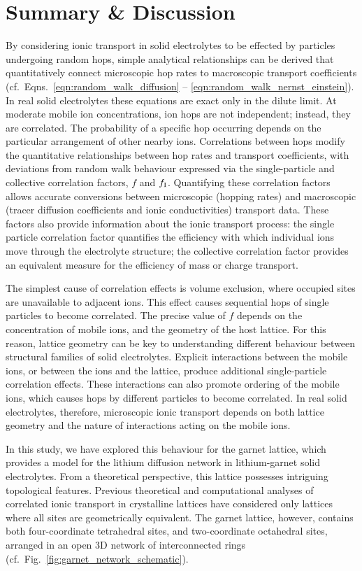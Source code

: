 \documentclass[aps,prb,twocolumn,superscriptaddress,reprint]{revtex4-1}
\begin{document}
\section{Summary \& Discussion}

By considering ionic transport in solid electrolytes to be effected by particles undergoing random hops, simple analytical relationships can be derived that quantitatively connect microscopic hop rates to macroscopic transport coefficients (cf.\ Eqns.~\ref{eqn:random_walk_diffusion} -- \ref{eqn:random_walk_nernst_einstein}). In real solid electrolytes these equations are exact only in the dilute limit. At moderate mobile ion concentrations, ion hops are not independent; 
instead, they are correlated. The probability of a specific hop occurring depends on the particular arrangement of other nearby ions. Correlations between hops modify the quantitative relationships between hop rates and transport coefficients, with deviations from random walk behaviour expressed via the single-particle and collective correlation factors, $f$ and $f_{\mathrm{I}}$. Quantifying these correlation factors allows accurate conversions between microscopic (hopping rates) and macroscopic (tracer diffusion coefficients and ionic conductivities) transport data. These factors also provide information about the ionic transport process: the single particle correlation factor quantifies the efficiency with which individual ions move through the electrolyte structure; the collective correlation factor provides an equivalent measure for the efficiency of mass or charge transport.

The simplest cause of correlation effects is volume exclusion, where occupied sites are unavailable to adjacent ions. This effect causes sequential hops of single particles to become correlated. The precise value of $f$ depends on the concentration of mobile ions, and the geometry of the host lattice. For this reason, lattice geometry can be key to understanding different behaviour between structural families of solid electrolytes. Explicit interactions between the mobile ions, or between the ions and the lattice, produce additional single-particle correlation effects. These interactions can also promote ordering of the mobile ions, which causes hops by different particles to become correlated. In real solid electrolytes, therefore, microscopic ionic transport depends on both lattice geometry and the nature of interactions acting on the mobile ions.

In this study, we have explored this behaviour for the garnet lattice, which provides a model for the lithium diffusion network in lithium-garnet solid electrolytes. From a theoretical perspective, this lattice possesses intriguing topological features. Previous theoretical and computational analyses of correlated ionic transport in crystalline lattices have considered only lattices where all sites are geometrically equivalent. The garnet lattice, however, contains both four-coordinate tetrahedral sites, and two-coordinate octahedral sites, arranged in an open 3D network of interconnected rings (cf.\ Fig.~\ref{fig:garnet_network_schematic}). 
\end{document}
